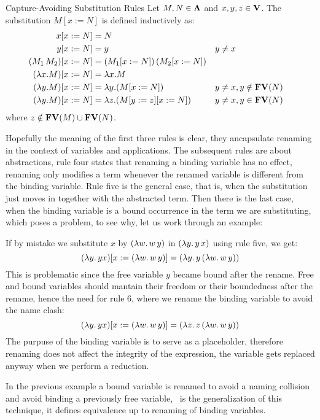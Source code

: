 \begin{definition}Capture-Avoiding Substitution Rules
  Let \( M, N \in \mathbf{\Lambda} \) and \( x, y, z \in \mathbf{V} \). The substitution \( M[x := N] \) is defined inductively as:
  \[
    \begin{aligned}
      x[x := N]                       & = N \\
      y[x := N]                       & = y && y \neq x \\
      (M_1\, M_2)[x := N]             & = (M_1[x := N])\,(M_2[x := N]) \\
      (\lambda x. M)[x := N]          & = \lambda x. M \\
      (\lambda y. M)[x := N]          & = \lambda y. (M[x := N]) && y \neq x, y \notin \mathbf{FV}( N ) \\
      (\lambda y. M)[x := N]          & = \lambda z. (M[y := z][x := N]) && y \neq x, y \in \mathbf{FV}( N )
    \end{aligned}
  \]
  where \( z \notin \mathbf{FV}( M ) \cup \mathbf{FV}( N ) \).
\end{definition}
Hopefully the meaning of the first three rules is clear, they ancapsulate renaming in the context of variables and applications. The subsequent rules are about abstractions, rule four states that renaming a binding variable has no effect, renaming only modifies a term whenever the renamed variable is different from the binding variable. Rule five is the general case, that is, when the substitution just moves in together with the abstracted term. Then there is the last case, when the binding variable is a bound occurrence in the term we are substituting, which poses a problem, to see why, let us work through an example:
\begin{example} If by mistake we substitute $x$ by \( (\lambda w . \, w \, y) \) in \( (\lambda y . \, y \, x ) \) using rule five, we get:
  \[
    (\lambda y . \, y x) [x := (\lambda w . \, w \, y)] = (\lambda y . \, y \, (\lambda w. \, w \, y))
  \]
  This is problematic since the free variable $y$ became bound after the rename. Free and bound variables should mantain their freedom or their boundedness after the rename, hence the need for rule 6, where we rename the binding variable to avoid the name clash:
  \[
    (\lambda y . \, y x) [x := (\lambda w . \, w \, y)] = (\lambda z . \, z \, (\lambda w. \, w \, y))
  \]
  The purpuse of the binding variable is to serve as a placeholder, therefore renaming does not affect the integrity of the expression, the variable gets replaced anyway when we perform a reduction.
\end{example}
In the previous example a bound variable is renamed to avoid a naming collision and avoid binding a previously free variable, \aequiv \ is the generalization of this technique, it defines equivalence up to renaming of binding variables.

